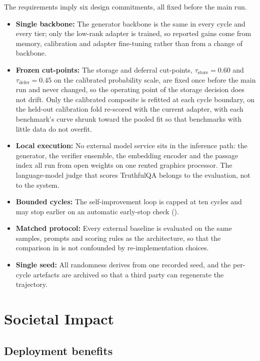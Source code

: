 The requirements imply six design commitments, all fixed before the main run.
\begin{itemize}
    \item \textbf{Single backbone:} The generator backbone is the same in every cycle and every tier; only the low-rank adapter is trained, so reported gains come from memory, calibration and adapter fine-tuning rather than from a change of backbone.
    \item \textbf{Frozen cut-points:} The storage and deferral cut-points, $\tau_{\text{store}} = 0.60$ and $\tau_{\text{defer}} = 0.45$ on the calibrated probability scale, are fixed once before the main run and never changed, so the operating point of the storage decision does not drift. Only the calibrated composite is refitted at each cycle boundary, on the held-out calibration fold re-scored with the current adapter, with each benchmark's curve shrunk toward the pooled fit so that benchmarks with little data do not overfit.
    \item \textbf{Local execution:} No external model service sits in the inference path: the generator, the verifier ensemble, the embedding encoder and the passage index all run from open weights on one rented graphics processor. The language-model judge that scores TruthfulQA belongs to the evaluation, not to the system.
    \item \textbf{Bounded cycles:} The self-improvement loop is capped at ten cycles and may stop earlier on an automatic early-stop check ().
    \item \textbf{Matched protocol:} Every external baseline is evaluated on the same samples, prompts and scoring rules as the architecture, so that the comparison in  is not confounded by re-implementation choices.
    \item \textbf{Single seed:} All randomness derives from one recorded seed, and the per-cycle artefacts are archived so that a third party can regenerate the trajectory.
\end{itemize}

\section{Societal Impact}
\label{sec:societal-impact}

\subsection{Deployment benefits}
\label{sec:soc-benefits}

